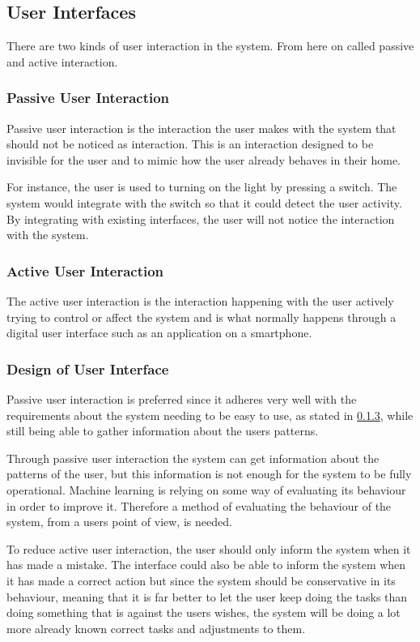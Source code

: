 \subsection{User Interfaces}
There are two kinds of user interaction in the system. From here on called passive and active interaction.

\subsubsection{Passive User Interaction}
Passive user interaction is the interaction the user makes with the system that
should not be noticed as interaction. This is an interaction designed to be
invisible for the user and to mimic how the user already behaves in their home.

For instance, the user is used to turning on the light by pressing a switch. The
system would integrate with the switch so that it could detect the user
activity. By integrating with existing interfaces, the user will not notice the
interaction with the system.

\subsubsection{Active User Interaction}
The active user interaction is the interaction happening with the user actively
trying to control or affect the system and is what normally happens through a
digital user interface such as an application on a smartphone.

\subsubsection{Design of User Interface}
Passive user interaction is preferred since it adheres very well with the
requirements about the system needing to be easy to use, as stated in
\cref{}, while still being
able to gather information about the users patterns.

Through passive user interaction the system can get information about the
patterns of the user, but this information is not enough for the system to be
fully operational. Machine learning is relying on some way of evaluating its
behaviour in order to improve it. Therefore a method of evaluating the behaviour
of the system, from a users point of view, is needed.
 
To reduce active user interaction, the user should only inform the system when
it has made a mistake. The interface could also be able to inform the system
when it has made a correct action but since the system should be conservative in
its behaviour, meaning that it is far better to let the user keep doing the
tasks than doing something that is against the users wishes, the system will be
doing a lot more already known correct tasks and adjustments to them.


